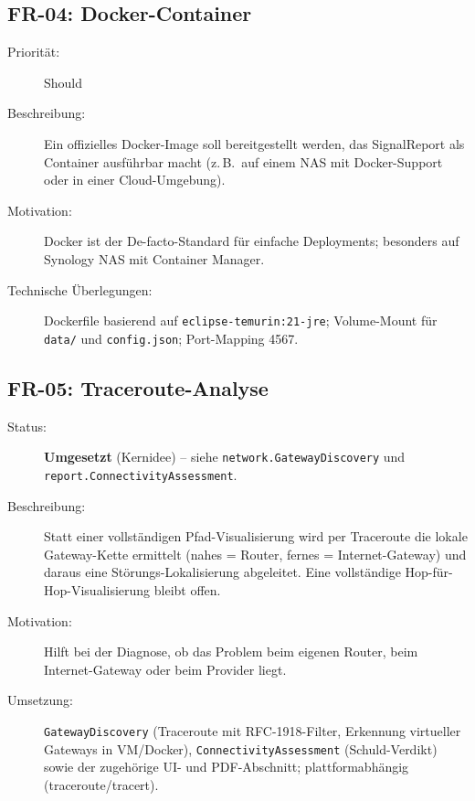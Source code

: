 \subsection{FR-04: Docker-Container}
\begin{description}
  \item[Priorität:] Should
  \item[Beschreibung:] Ein offizielles Docker-Image soll bereitgestellt werden, das
    SignalReport als Container ausführbar macht (z.\,B.\ auf einem NAS mit Docker-Support
    oder in einer Cloud-Umgebung).
  \item[Motivation:] Docker ist der De-facto-Standard für einfache Deployments; besonders
    auf Synology NAS mit Container Manager.
  \item[Technische Überlegungen:] Dockerfile basierend auf \texttt{eclipse-temurin:21-jre};
    Volume-Mount für \texttt{data/} und \texttt{config.json}; Port-Mapping 4567.
\end{description}

\subsection{FR-05: Traceroute-Analyse}
\begin{description}
  \item[Status:] \textbf{Umgesetzt} (Kernidee) -- siehe \texttt{network.GatewayDiscovery} und \texttt{report.ConnectivityAssessment}.
  \item[Beschreibung:] Statt einer vollständigen Pfad-Visualisierung wird per Traceroute die
    lokale Gateway-Kette ermittelt (nahes = Router, fernes = Internet-Gateway) und daraus eine
    Störungs-Lokalisierung abgeleitet. Eine vollständige Hop-für-Hop-Visualisierung bleibt offen.
  \item[Motivation:] Hilft bei der Diagnose, ob das Problem beim eigenen Router, beim
    Internet-Gateway oder beim Provider liegt.
  \item[Umsetzung:] \texttt{GatewayDiscovery} (Traceroute mit RFC-1918-Filter, Erkennung
    virtueller Gateways in VM/Docker), \texttt{ConnectivityAssessment} (Schuld-Verdikt) sowie
    der zugehörige UI- und PDF-Abschnitt; plattformabhängig (traceroute/tracert).
\end{description}

